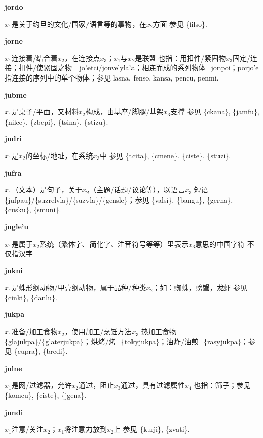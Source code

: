 \documentclass[notitlepage,twocolumn,a4paper,10pt]{book}
\begin{document}
{\sffamily\bfseries jordo}\enspace {\ttfamily\bfseries[jor     jo'o]}  $x_1$是关于约旦的文化\slash{}国家\slash{}语言等的事物，在$x_2$方面 \textemdash{} 参见 \{filso\}.

{\sffamily\bfseries jorne}\enspace {\ttfamily\bfseries[jon     jo'e]}  $x_1$连接着\slash{}结合着$x_2$，在连接点$x_3$；$x_1$与$x_2$是联盟 \textemdash{} 也指：用扣件\slash{}紧固物$x_3$固定\slash{}连接；扣件\slash{}使紧固之物= {jo'etci}\slash{}{jonvelyla'a}；相连而成的系列物体={jonpoi}；{porjo'e} 指连接的序列中的单个物体；参见 {lasna}, {fenso}, {kansa}, {pencu}, {penmi}.

{\sffamily\bfseries jubme}  $x_1$是桌子\slash{}平面，又材料$x_2$构成，由基座\slash{}脚腿\slash{}基架$x_3$支撑 \textemdash{} 参见 \{ckana\}, \{jamfu\}, \{nilce\}, \{zbepi\}, \{tsina\}, \{stizu\}.

{\sffamily\bfseries judri} $x_1$是$x_2$的坐标\slash{}地址，在系统$x_3$中 \textemdash{} 参见 \{tcita\}, \{cmene\}, \{ciste\}, \{stuzi\}.

{\sffamily\bfseries jufra}\enspace {\ttfamily\bfseries[juf     ju'a]}  $x_1$（文本）是句子，关于$x_2$（主题\slash{}话题\slash{}议论等），以语言$x_3$ \textemdash{} 短语=\{jufpau\}\slash{}\{suzrelvla\}\slash{}\{suzvla\}\slash{}\{gensle\}；参见 \{valsi\}, \{bangu\}, \{gerna\}, \{cusku\}, \{smuni\}.

{\sffamily\bfseries jugle'u} $x_1$是属于$x_2$系统（繁体字、简化字、注音符号等等）里表示$x_3$意思的中国字符 \textemdash{} 不仅指汉字

{\sffamily\bfseries jukni}\enspace {\ttfamily\bfseries[juk]}  $x_1$是蛛形纲动物\slash{}甲壳纲动物，属于品种\slash{}种类$x_2$；如：蜘蛛，螃蟹，龙虾 \textemdash{} 参见 \{cinki\}, \{danlu\}.

{\sffamily\bfseries jukpa}\enspace {\ttfamily\bfseries[jup]}  $x_1$准备\slash{}加工食物$x_2$，使用加工\slash{}烹饪方法$x_3$ \textemdash{} 热加工食物=\{glajukpa\}\slash{}\{glaterjukpa\}；烘烤\slash{}烤=\{tokyjukpa\}；油炸\slash{}油煎=\{rasyjukpa\}；参见 \{cupra\}, \{bredi\}.

{\sffamily\bfseries julne}\enspace {\ttfamily\bfseries[        ju'e]}  $x_1$是网\slash{}过滤器，允许$x_2$通过，阻止$x_3$通过，具有过滤属性$x_4$ \textemdash{} 也指：筛子；参见 \{komcu\}, \{ciste\}, \{jgena\}.

{\sffamily\bfseries jundi}\enspace {\ttfamily\bfseries[jud     ju'i]}  $x_1$注意\slash{}关注$x_2$；$x_1$将注意力放到$x_2$上 \textemdash{} 参见 \{kurji\}, \{zvati\}.
\end{document}
